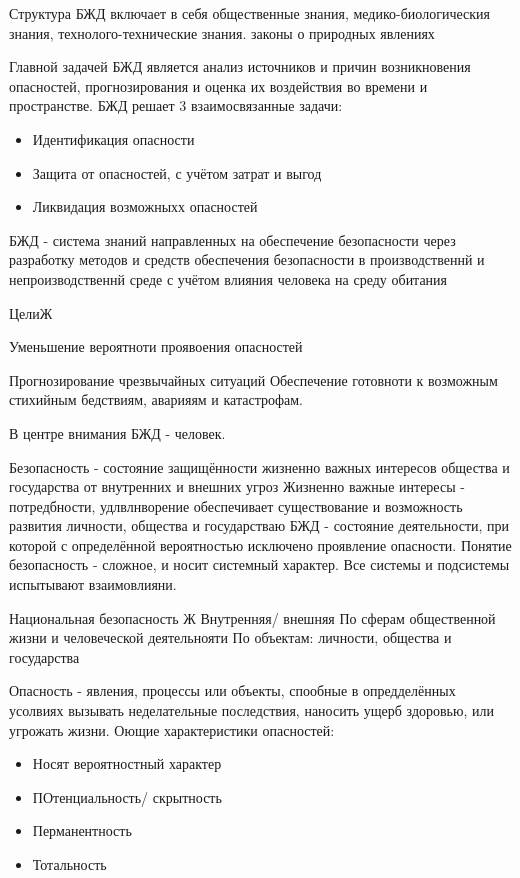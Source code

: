 \documentclass[a4paper,12pt]{report}
\begin{document}
	
	Структура БЖД включает в себя общественные знания, медико-биологическия знания, технолого-технические знания. законы о природных явлениях

	Главной задачей БЖД является анализ источников и причин возникновения опасностей, прогнозирования и оценка их воздействия во времени и пространстве.
	БЖД решает 3 взаимосвязанные задачи: 
	\begin{itemize}
	\item	Идентификация опасности
	\item	Защита от опасностей, с учётом затрат и выгод
	\item	Ликвидация возможныхх опасностей
	\end{itemize}
	
	БЖД - система знаний направленных на обеспечение безопасности через разработку методов и средств обеспечения безопасности в производственнй и непроизводственнй среде с учётом влияния человека на среду обитания
	
	ЦелиЖ
	\item	Уменьшение вероятноти проявоения опасностей
	\item	Прогнозирование чрезвычайных ситуаций
	Обеспечение готовноти к возможным стихийным бедствиям, аварияям и катастрофам.
	
	В центре внимания БЖД - человек.
	
	
	
	Безопасность - состояние защищённости жизненно важных интересов общества и государства от внутренних и внешних угроз
	Жизненно важные интересы - потредбности, удлвлнворение обеспечивает существование и возможность развития личности, общества и государстваю
	БЖД - состояние деятельности, при которой с определённой вероятностью исключено проявление опасности.
	Понятие безопасность - сложное, и носит системный характер. Все системы и подсистемы испытывают взаимовлияни.
	
	Национальная безопасность Ж
	Внутренняя/ внешняя
	По сферам общественной жизни и человеческой деятельнояти
	По объектам: личности, общества и государства
	
	
	Опасность - явления, процессы или объекты, спообные в опредделённых усолвиях вызывать неделательные последствия, наносить ущерб здоровью, или угрожать жизни.
	Оющие характеристики опасностей:
	\begin{itemize}
	\item	Носят вероятностный характер
	\item	ПОтенциальность/ скрытность
	\item	Перманентность
	\item	Тотальность
	\end{itemize}
	
\end{document}
